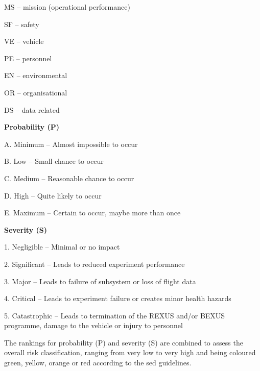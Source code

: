 \documentclass[12pt,a4paper]{report}
\begin{document}
MS -- mission (operational performance)

SF -- safety

VE -- vehicle

PE -- personnel

EN -- environmental

OR -- organisational

DS -- data related

\textbf{Probability (P)}

A. Minimum -- Almost impossible to occur

B. Low -- Small chance to occur

C. Medium -- Reasonable chance to occur

D. High -- Quite likely to occur

E. Maximum -- Certain to occur, maybe more than once

\textbf{Severity (S)}

1. Negligible -- Minimal or no impact

2. Significant -- Leads to reduced experiment performance

3. Major -- Leads to failure of subsystem or loss of flight data

4. Critical -- Leads to experiment failure or creates minor health hazards

5. Catastrophic -- Leads to termination of the REXUS and/or BEXUS programme, damage to the vehicle or injury to personnel

The rankings for probability (P) and severity (S) are combined to assess the overall risk classification, ranging from very low to very high and being coloured green, yellow, orange or red according to the \ac{sed} guidelines.
\end{document}
